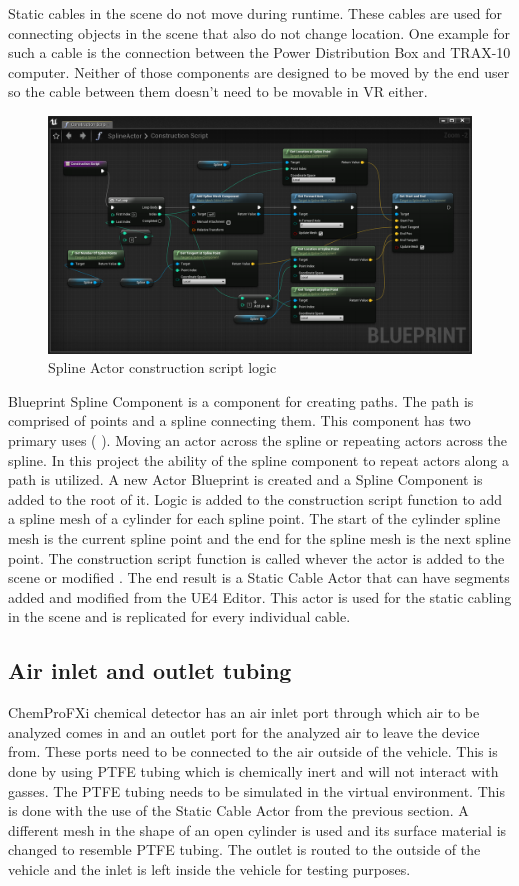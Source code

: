 \documentclass[12pt, a4paper,oneside, nocenter]{thesis}
\newcommand{\citeyeartitlexamkinline}[1]{(\usebibentry{#1}{title} \citeyear{#1})}
\begin{document}
\par
Static cables in the scene do not move during runtime. These cables are used for connecting objects in the scene that also do not change location. One example for such a cable is the connection between the Power Distribution Box and TRAX-10 computer. Neither of those components are designed to be moved by the end user so the cable between them doesn't need to be movable in VR either.
\begin{figure}[H]
	\includegraphics[width=\textwidth]{spline-component}
	\caption{Spline Actor construction script logic}
	\label{fig:spline-component}
\end{figure}
\par
Blueprint Spline Component is a component for creating paths. The path is comprised of points and a spline connecting them. This component has two primary uses \citeyeartitlexamkinline{spline-component}. Moving an actor across the spline or repeating actors across the spline. In this project the ability of the spline component to repeat actors along a path is utilized. A new Actor Blueprint is created and a Spline Component is added to the root of it. Logic is added to the construction script function to add a spline mesh of a cylinder for each spline point. The start of the cylinder spline mesh is the current spline point and the end for the spline mesh is the next spline point. The construction script function is called whever the actor is added to the scene or modified . The end result is a Static Cable Actor that can have segments added and modified from the UE4 Editor. This actor is used for the static cabling in the scene and is replicated for every individual cable.
\subsection{Air inlet and outlet tubing}
ChemProFXi chemical detector has an air inlet port through which air to be analyzed comes in and an outlet port for the analyzed air to leave the device from. These ports need to be connected to the air outside of the vehicle. This is done by using PTFE tubing which is chemically inert and will not interact with gasses. The PTFE tubing needs to be simulated in the virtual environment. This is done with the use of the Static Cable Actor from the previous section. A different mesh in the shape of an open cylinder is used and its surface material is changed to resemble PTFE tubing. The outlet is routed to the outside of the vehicle and the inlet is left inside the vehicle for testing purposes.
\end{document}
